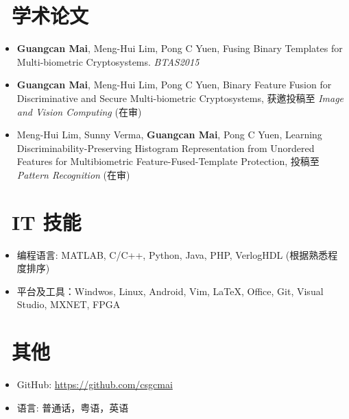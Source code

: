 \documentclass{resume}
\begin{document}
\section{\faBook\ 学术论文}
\begin{itemize}
	\item \textbf{Guangcan Mai}, Meng-Hui Lim, Pong C Yuen, Fusing Binary Templates for Multi-biometric Cryptosystems. \textit{BTAS2015}
	\item \textbf{Guangcan Mai}, Meng-Hui Lim, Pong C Yuen, Binary Feature Fusion for Discriminative and Secure Multi-biometric Cryptosystems, 获邀投稿至 \textit{Image and Vision Computing} (在审)
	\item Meng-Hui Lim, Sunny Verma, \textbf{Guangcan Mai}, Pong C Yuen, Learning Discriminability-Preserving Histogram Representation from Unordered Features for Multibiometric Feature-Fused-Template Protection, 投稿至 \textit{Pattern Recognition} (在审)
\end{itemize}


\section{\faCogs\ IT 技能}
\begin{itemize}[parsep=0.5ex]
	\item 编程语言: MATLAB, C/C++, Python, Java, PHP, VerlogHDL (根据熟悉程度排序)
	\item 平台及工具：Windwos, Linux, Android,  Vim, \LaTeX, Office, Git, Visual Studio, MXNET, FPGA
\end{itemize}

\section{\faInfo\ 其他}
\begin{itemize}[parsep=0.5ex]
  \item GitHub: \url{https://github.com/csgcmai}
  \item 语言: 普通话，粤语，英语
\end{itemize}

%
%
\end{document}
